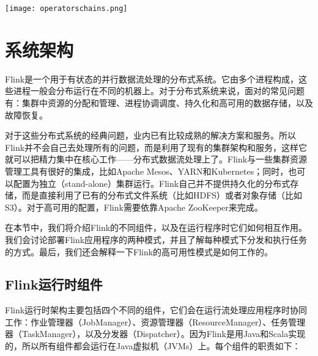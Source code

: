 \documentclass[oneside]{ctexbook}
\begin{document}
\noindent \texttt{[image: operatorschains.png]}

\section{系统架构}

Flink是一个用于有状态的并行数据流处理的分布式系统。它由多个进程构成，这些进程一般会分布运行在不同的机器上。对于分布式系统来说，面对的常见问题有：集群中资源的分配和管理、进程协调调度、持久化和高可用的数据存储，以及故障恢复。

对于这些分布式系统的经典问题，业内已有比较成熟的解决方案和服务。所以Flink并不会自己去处理所有的问题，而是利用了现有的集群架构和服务，这样它就可以把精力集中在核心工作——分布式数据流处理上了。Flink与一些集群资源管理工具有很好的集成，比如Apache Mesos、YARN和Kubernetes；同时，也可以配置为独立（stand-alone）集群运行。Flink自己并不提供持久化的分布式存储，而是直接利用了已有的分布式文件系统（比如HDFS）或者对象存储（比如S3）。对于高可用的配置，Flink需要依靠Apache ZooKeeper来完成。

在本节中，我们将介绍Flink的不同组件，以及在运行程序时它们如何相互作用。我们会讨论部署Flink应用程序的两种模式，并且了解每种模式下分发和执行任务的方式。最后，我们还会解释一下Flink的高可用性模式是如何工作的。

\subsection{Flink运行时组件}

Flink运行时架构主要包括四个不同的组件，它们会在运行流处理应用程序时协同工作：作业管理器（JobManager）、资源管理器（ResourceManager）、任务管理器（TaskManager），以及分发器（Dispatcher）。因为Flink是用Java和Scala实现的，所以所有组件都会运行在Java虚拟机（JVMs）上。每个组件的职责如下：
\end{document}

